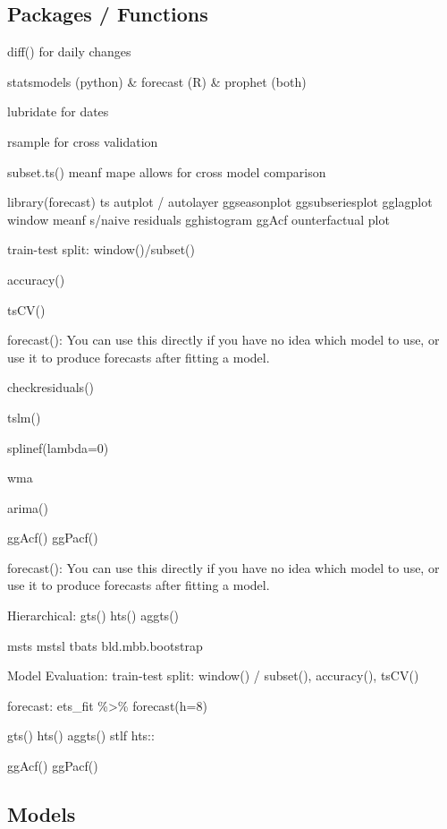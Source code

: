 \documentclass[]{book}
\begin{document}
\hypertarget{packages-functions}{%
\subsection{Packages / Functions}\label{packages-functions}}

diff() for daily changes

statsmodels (python) \& forecast (R) \& prophet (both)

lubridate for dates

rsample for cross validation

subset.ts() \textbar{} meanf \textbar{} mape allows for cross model comparison

library(forecast) \textbar{} ts \textbar{} autplot / autolayer \textbar{} ggseasonplot \textbar{} ggsubseriesplot \textbar{} gglagplot \textbar{} window \textbar{} meanf \textbar{} s/naive \textbar{} residuals \textbar{} gghistogram \textbar{} ggAcf \textbar{} ounterfactual plot

train-test split: window()/subset()

accuracy()

tsCV()

forecast(): You can use this directly if you have no idea which model to use, or use it to produce forecasts after fitting a model.

checkresiduals()

tslm()

splinef(lambda=0)

wma

arima()

ggAcf() \textbar{} ggPacf()

forecast(): You can use this directly if you have no idea which model to use, or use it to produce forecasts after fitting a model.

Hierarchical: gts() \textbar{} hts() \textbar{} aggts()

msts \textbar{} mstsl \textbar{} tbats \textbar{} bld.mbb.bootstrap

Model Evaluation: train-test split: window() / subset(), accuracy(), tsCV()

forecast: ets\_fit \%\textgreater{}\% forecast(h=8)

gts() \textbar{} hts() \textbar{} aggts() \textbar{} stlf \textbar{} hts::

ggAcf() \textbar{} ggPacf()

\hypertarget{models}{%
\subsection{Models}\label{models}}
\end{document}
